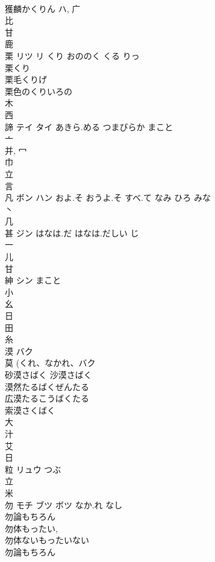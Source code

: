 \documentclass[8pt]{extreport}
\begin{document}
\begin{CJK}{UTF8}{min}
\\	獲麟かくりん	ハ, 广 
\\	比 
\\	甘 
\\	鹿 
\\	栗	リツ リ	くり おののく くる りっ	
\\	栗くり 
\\	栗毛くりげ 
\\	栗色のくりいろの 
\\	木 
\\	西 
\\	諦	テイ タイ	あきら.める つまびらか まこと	
\\	亠 
\\	并, 冖 
\\	巾 
\\	立 
\\	言 
\\	凡	ボン ハン	およ.そ おうよ.そ すべ.て なみ ひろ みな	
\\	丶 
\\	几 
\\	甚	ジン	はなは.だ はなは.だしい じ	
\\	一 
\\	儿 
\\	甘 
\\	紳	シン	まこと	
\\	小 
\\	幺 
\\	日 
\\	田 
\\	糸 
\\	漠	バク		
\\	莫 (くれ、なかれ、バク 
\\	砂漠さばく 沙漠さばく 
\\	漠然たるばくぜんたる 
\\	広漠たるこうばくたる 
\\	索漠さくばく 
\\	大 
\\	汁 
\\	艾 
\\	日 
\\	粒	リュウ	つぶ	
\\	立 
\\	米 
\\	勿	モチ ブツ ボツ	なか.れ なし	
\\	勿論もちろん 
\\	勿体もったい, 
\\	勿体ないもったいない 
\\	勿論もちろん 

\end{CJK}
\end{document}
